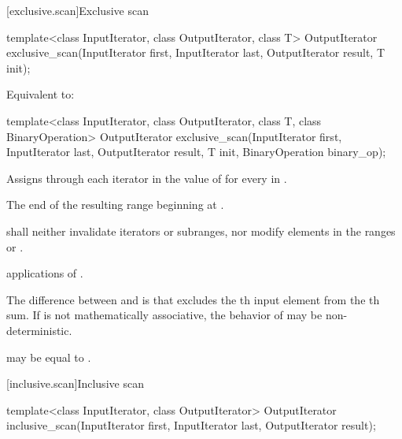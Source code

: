 [exclusive.scan]{Exclusive scan}

%
\begin{itemdecl}
template<class InputIterator, class OutputIterator, class T>
  OutputIterator exclusive_scan(InputIterator first, InputIterator last,
                                OutputIterator result,
                                T init);
\end{itemdecl}

\begin{itemdescr}
\pnum
\effects
Equivalent to: 
\end{itemdescr}

\begin{itemdecl}
template<class InputIterator, class OutputIterator, class T, class BinaryOperation>
  OutputIterator exclusive_scan(InputIterator first, InputIterator last,
                                OutputIterator result,
                                T init, BinaryOperation binary_op);
\end{itemdecl}

\begin{itemdescr}
\pnum
\effects
Assigns through each iterator  in  the value of
for every  in .

\pnum
\returns
The end of the resulting range beginning at .

\pnum
\requires
{} shall neither invalidate iterators or subranges, nor modify
elements in the
ranges  or .

\pnum
\complexity
{} applications of .

\pnum
\realnotes
The difference between  and  is
that  excludes the th input element from the
th sum. If  is not mathematically associative, the
behavior of  may be non-deterministic.

\pnum
\remarks
{} may be equal to .
\end{itemdescr}

[inclusive.scan]{Inclusive scan}

%
\begin{itemdecl}
template<class InputIterator, class OutputIterator>
  OutputIterator inclusive_scan(InputIterator first, InputIterator last,
                                OutputIterator result);
\end{itemdecl}

